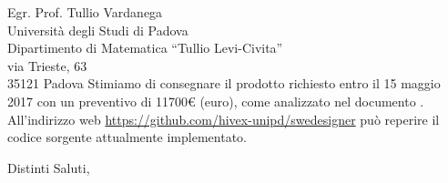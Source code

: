 \documentclass[a4paper]{letter} %
\begin{document}
\begin{letter}{Egr. Prof. Tullio Vardanega\\
Università degli Studi di Padova\\
Dipartimento di Matematica “Tullio Levi-Civita”\\
via Trieste, 63\\
35121 Padova}
Stimiamo di consegnare il prodotto richiesto entro il 15 maggio 2017 con un preventivo di \num{11700}\euro{} (euro), come analizzato nel documento \PdP. All'indirizzo web \url{https://github.com/hivex-unipd/swedesigner} pu\`o reperire il codice sorgente attualmente implementato.

\closing{Distinti Saluti,}

\end{letter}
\end{document}
